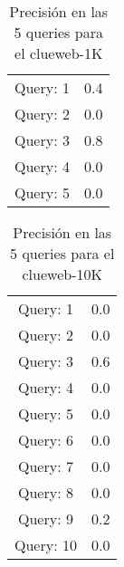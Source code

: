 
\begin{table}[hbtp]
\centering
\begin{tabular}{cc}
Query: 1&0.4
\\
Query: 2&0.0
\\
Query: 3&0.8
\\
Query: 4&0.0
\\
Query: 5&0.0
\\
\end{tabular}
\caption{Precisi\'{o}n en las 5 queries para el clueweb-1K}
\end{table}
\begin{table}[hbtp]
\centering
\begin{tabular}{cc}
Query: 1&0.0
\\
Query: 2&0.0
\\
Query: 3&0.6
\\
Query: 4&0.0
\\
Query: 5&0.0
\\
Query: 6&0.0
\\
Query: 7&0.0
\\
Query: 8&0.0
\\
Query: 9&0.2
\\
Query: 10&0.0
\\
\end{tabular}
\caption{Precisi\'{o}n en las 5 queries para el clueweb-10K}
\end{table}
